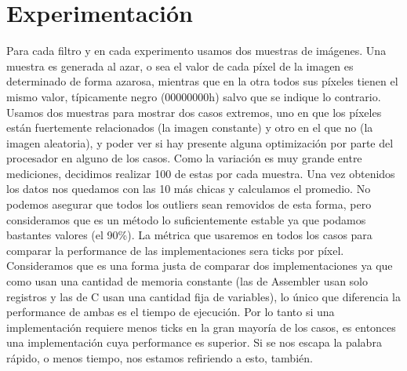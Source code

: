 


\section{Experimentación}
\hfill \break
Para cada filtro y en cada experimento usamos dos muestras de imágenes. Una muestra es generada al azar, o sea el valor de cada píxel de la imagen es determinado de forma azarosa, mientras que en la otra todos sus píxeles tienen el mismo valor, típicamente negro (00000000h) salvo que se indique lo contrario. Usamos dos muestras para mostrar dos casos extremos, uno en que los píxeles están fuertemente relacionados (la imagen constante) y otro en el que no (la imagen aleatoria), y poder ver si hay presente alguna optimización por parte del procesador en alguno de los casos. 
\hfill \break
Como la variación es muy grande entre mediciones, decidimos realizar 100 de estas por cada muestra. Una vez obtenidos los datos nos quedamos con las 10 más chicas y calculamos el promedio. No podemos asegurar que todos los outliers sean removidos de esta forma, pero consideramos que es un método lo suficientemente estable ya que podamos bastantes valores (el 90\%). 
\hfill \break
La métrica que usaremos en todos los casos para comparar la performance de las implementaciones sera ticks por píxel. Consideramos que es una forma justa de comparar dos implementaciones ya que como usan una cantidad de memoria constante (las de Assembler usan solo registros y las de C usan una cantidad fija de variables), lo único que diferencia la performance de ambas es el tiempo de ejecución. Por lo tanto si una implementación requiere menos ticks en la gran mayoría de los casos, es entonces una implementación cuya performance es superior. Si se nos escapa la palabra rápido, o menos tiempo, nos estamos refiriendo a esto, también. 
\hfill \break
